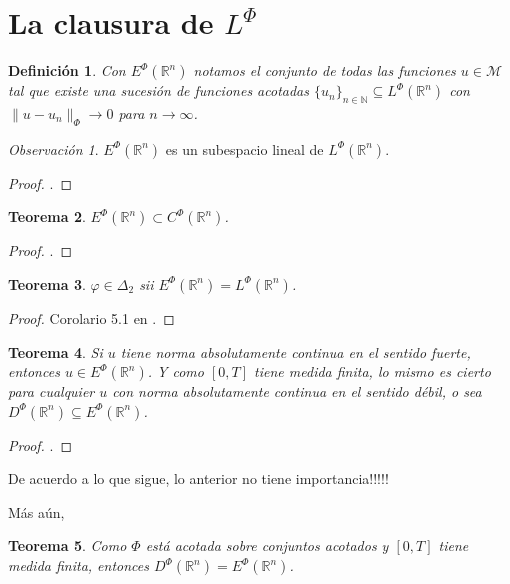 \documentclass[a4paper,11pt]{amsart}
\theoremstyle{plain}
\newtheorem{thm}{Teorema}[section]
\newtheorem{defi}[thm]{Definici\'on}
\theoremstyle{remark}
\newtheorem{rem}{Observaci\'on}
\theoremstyle{remark}
\newcommand{\rr}{\mathbb{R}}
\newcommand{\nn}{\mathbb{N}}
\numberwithin{equation}{section}
\begin{document}
\section{La clausura de $L^{\Phi}$}

\begin{defi}
Con $E^{\Phi}(\rr^n)$ notamos el conjunto de todas las funciones $u \in \mathcal{M}$ tal que existe una sucesi\'on de funciones acotadas
$\{u_n\}_{n \in \nn}\subseteq L^{\Phi}(\rr^n)$ con $\|u-u_n\|_{\Phi}\to 0$ para $n \to \infty$.
\end{defi}

\begin{rem}
$E^{\Phi}(\rr^n)$ es un subespacio lineal de $L^{\Phi}(\rr^n)$.
\end{rem}

\begin{proof}
\cite[p. 369]{Schap2005}.
\end{proof}

\begin{thm}
$E^{\Phi}(\rr^n)\subset C^{\Phi}(\rr^n)$.
\end{thm}

\begin{proof}
\cite[pp. 369-370]{Schap2005}.
\end{proof}


\begin{thm}
$\varphi \in \Delta_2$ sii $E^{\Phi}(\rr^n)=L^{\Phi}(\rr^n)$.
\end{thm}

\begin{proof}
Corolario 5.1 en \cite[pp. 371]{Schap2005}.
\end{proof}

\begin{thm}
Si $u$ tiene norma absolutamente continua en el sentido fuerte, entonces $u \in E^{\Phi}(\rr^n)$. 
Y como $[0,T]$ tiene medida finita, lo mismo es cierto para cualquier $u$ con norma absolutamente continua  en el sentido d\'ebil, o 
sea $D^{\Phi}(\rr^n)\subseteq E^{\Phi}(\rr^n)$.
\end{thm}

\begin{proof}
\cite[p. 372]{Schap2005}.
\end{proof}

De acuerdo a lo que sigue, lo anterior no tiene importancia!!!!!


M\'as a\'un,
\begin{thm}
Como $\Phi$ est\'a acotada sobre conjuntos acotados y $[0,T]$ tiene medida finita, entonces $D^{\Phi}(\rr^n)=E^{\Phi}(\rr^n)$.
\end{thm}
\end{document}
